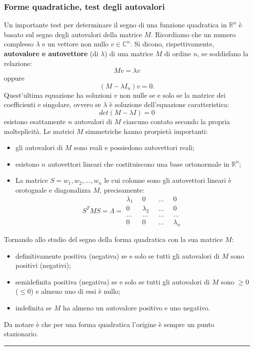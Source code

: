 \subsubsection{Forme quadratiche, test degli autovalori}
Un importante test per determinare il segno di una funzione quadratica in $\mathbb{R}^n$ è basato sul segno degli autovalori della matrice $M$.\newline
Ricordiamo che un numero complesso $\lambda$ e un vettore non nullo $v \in \mathbb{C}^n$. Si dicono, rispettivamente, \textbf{autovalore e autovettore} (di $\lambda$) di una matrice $M$ di ordine $n$, se soddisfano la relazione:
\[
    Mv = \lambda v
\]
oppure
\[
    (M-\lambda I_n)v = 0.
\]
Quest'ultima equazione ha soluzioni $v$ non nulle se e solo se la matrice dei coefficienti e singolare, ovvero se $\lambda$ è soluzione dell'equazione caratteristica:
\[
    det(M-\lambda I) = 0
\]
esistono esattamente $n$ autovalori di $M$ ciascuno contato secondo la propria molteplicità.\newline
Le matrici $M$ simmetriche hanno prorpietà importanti:
\begin{itemize}
    \item gli autovalori di $M$ sono reali e possiedono autovettori reali;
    \item esistono $n$ autovettori lineari che costituiscono una base ortonormale in $\mathbb{R}^n$;
    \item La matrice $S = {w_1, w_2, \dots, w_n}$ le cui colonne sono gli autovettori lineari è orotognale e diagonalizza $M$, precisamente:
    \[
        S^TMS = \Lambda = \begin{matrix}
            \lambda_1 \;\; &0 \;\; &\dots \;\; &0\\
            0 \;\; &\lambda_2 \;\; &\dots \;\; &0\\
            \dots \;\; &\dots \;\; &\dots \;\; &\dots\\
            0 \;\; &0 \;\; &\dots \;\; &\lambda_n
        \end{matrix}
    \]
\end{itemize}
\begin{tcolorbox}
Tornando allo studio del segno della forma quadratica con la sua matrice $M$:
\begin{itemize}
    \item definitivamente positiva (negativa) se e solo se tutti gli autovalori di $M$ sono positivi (negativi);
    \item semidefinita positiva (negativa) se e solo se tutti gli autovalori di $M$ sono $\geq 0$ ($\leq 0$) e almeno uno di essi è nullo;
    \item indefinita se $M$ ha almeno un autovalore positivo e uno negativo.
\end{itemize}
\end{tcolorbox}
Da notare è che per una forma quadratica l'origine è sempre un punto stazionario. \newline
\rule{\textwidth}{0.4pt}
